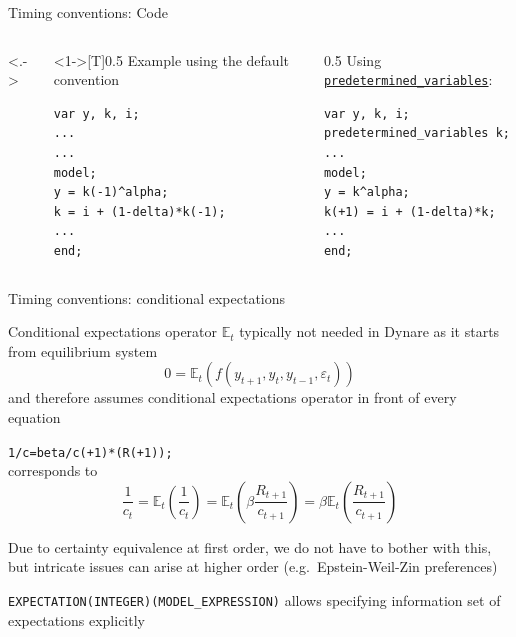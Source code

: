 \documentclass[handout,usepdftitle=false,xcolor=dvipsnames,aspectratio=169]{beamer}
\begin{document}
\begin{frame}[fragile]{Timing conventions: Code}
\begin{columns}<.->
\begin{column}<1->[T]{0.5\textwidth}
Example using the default convention
\begin{verbatim}
var y, k, i;
...
...
model;
y = k(-1)^alpha;
k = i + (1-delta)*k(-1);
...
end;
\end{verbatim}
\end{column}
\begin{column}[T]{0.5\textwidth}
Using \href{https://www.dynare.org/manual/the-model-file.html?highlight=predetermined#predetermined_variables}{\texttt{predetermined\_variables}}:
\begin{verbatim}
var y, k, i;
predetermined_variables k;
...
model;
y = k^alpha;
k(+1) = i + (1-delta)*k;
...
end;
\end{verbatim}
\end{column}
\end{columns}
\end{frame}

\begin{frame}{Timing conventions: conditional expectations}
\begin{witemize}
\item Conditional expectations operator $\mathbb{E}_t$ typically not needed in Dynare as it starts from equilibrium system
\begin{equation}
0=\mathbb{E}_t\left(f(y_{t+1},y_t,y_{t-1},\varepsilon_t)\right)
\end{equation}
and therefore assumes conditional expectations operator in front of every equation
\item \texttt{1/c=beta/c(+1)*(R(+1));}\\
corresponds to
\begin{equation}
\frac{1}{c_t}=\mathbb{E}_t\left(\frac{1}{c_t}\right)=\mathbb{E}_t\left(\beta \frac{R_{t+1}}{c_{t+1}}\right)=\beta \mathbb{E}_t\left(\frac{R_{t+1}}{c_{t+1}}\right)
\end{equation}
\item Due to certainty equivalence at first order, we do not have to bother with this, but intricate issues can arise at higher order (e.g.\ Epstein-Weil-Zin preferences)
    \item \texttt{EXPECTATION(INTEGER)(MODEL\_EXPRESSION)} allows specifying information set of expectations explicitly
\end{witemize}
\end{frame}
\end{document}
